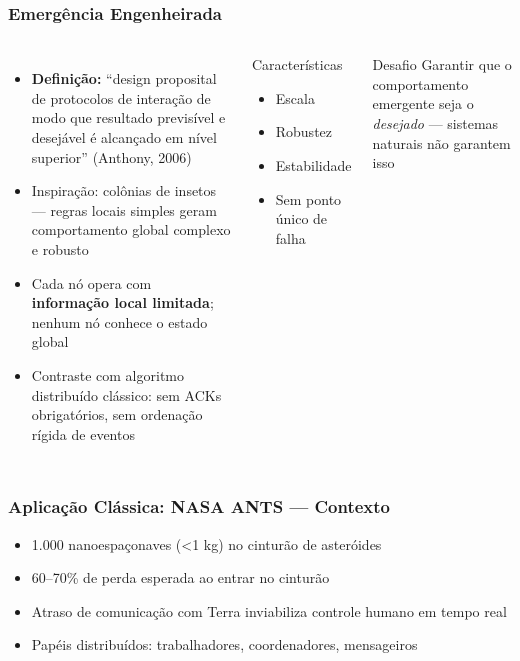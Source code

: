 \documentclass{beamer}
\begin{document}
  \begin{frame}
    \frametitle{Emergência Engenheirada}
    \begin{columns}
      \footnotesize
      \begin{itemize}
        \item \textbf{Definição:} ``design proposital de protocolos de interação de modo que resultado previsível e desejável é alcançado em nível superior'' (Anthony, 2006)
        \item Inspiração: colônias de insetos --- regras locais simples geram comportamento global complexo e robusto
        \item Cada nó opera com \textbf{informação local limitada}; nenhum nó conhece o estado global
        \item Contraste com algoritmo distribuído clássico: sem ACKs obrigatórios, sem ordenação rígida de eventos
      \end{itemize}
      \begin{block}{Características}
        \footnotesize
        \begin{itemize}
          \item Escala
          \item Robustez
          \item Estabilidade
          \item Sem ponto único de falha
        \end{itemize}
      \end{block}
      \begin{alertblock}{Desafio}
        \footnotesize
        Garantir que o comportamento emergente seja o \textit{desejado} --- sistemas naturais não garantem isso
      \end{alertblock}
    \end{columns}
  \end{frame}

  \begin{frame}
    \frametitle{Aplicação Clássica: NASA ANTS --- Contexto}
    \begin{itemize}
      \item 1.000 nanoespaçonaves (\textless{}1 kg) no cinturão de asteróides
      \item 60--70\% de perda esperada ao entrar no cinturão
      \item Atraso de comunicação com Terra inviabiliza controle humano em tempo real
      \item Papéis distribuídos: trabalhadores, coordenadores, mensageiros
    \end{itemize}
  \end{frame}
\end{document}

